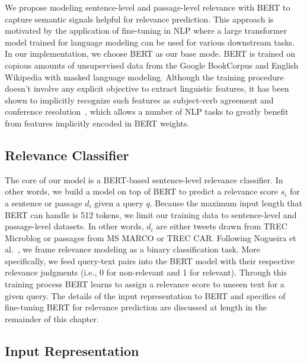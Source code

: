 We propose modeling sentence-level and passage-level relevance with BERT to capture semantic signals helpful for relevance prediction.
This approach is motivated by the application of fine-tuning in NLP where a large transformer model trained for language modeling can be used for various downstream tasks.
In our implementation, we choose BERT as our base mode.
BERT is trained on copious amounts of unsupervised data from the Google BookCorpus and English Wikipedia with masked language modeling.
Although the training procedure doesn't involve any explicit objective to extract linguistic features, it has been shown to implicitly recognize such features as subject-verb agreement and conference resolution~\cite{jawahar2019does, clark2019does}, which allows a number of NLP tasks to greatly benefit from features implicitly encoded in BERT weights.

\subsection{Relevance Classifier}

The core of our model is a BERT-based sentence-level relevance classifier.
In other words, we build a model on top of BERT to predict a relevance score $ s_i $ for a sentence or passage $ d_i $ given a query $ q $.
Because the maximum input length that BERT can handle is 512 tokens, we limit our training data to sentence-level and passage-level datasets.
In other words, $ d_i $ are either tweets drawn from TREC Microblog or passages from MS MARCO or TREC CAR.
Following Nogueira et al.~\cite{nogueira2019passage}, we frame relevance modeling as a binary classification task.
More specifically, we feed query-text pairs into the BERT model with their respective relevance judgments (i.e., 0 for non-relevant and 1 for relevant).
Through this training process BERT learns to assign a relevance score to unseen text for a given query.
The details of the input representation to BERT and specifics of fine-tuning BERT for relevance prediction are discussed at length in the remainder of this chapter.

\subsection{Input Representation}

